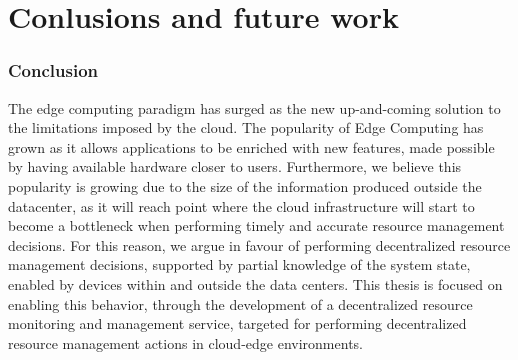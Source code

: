 

\chapter{Conlusions and future work} \label{cha:conclusions_future_work}

\subsection{Conclusion}

The edge computing paradigm has surged as the new up-and-coming solution to the limitations imposed by the cloud. The popularity of Edge Computing has grown as it allows applications to be enriched with new features, made possible by having available hardware closer to users. Furthermore, we believe this popularity is growing due to the size of the information produced outside the datacenter, as it will reach point where the cloud infrastructure will start to become a bottleneck when performing timely and accurate resource management decisions. For this reason, we argue in favour of performing decentralized resource management decisions, supported by partial knowledge of the system state, enabled by devices within and outside the data centers. This thesis is focused on enabling this behavior, through the development of a decentralized resource monitoring and management service, targeted for performing decentralized resource management actions in cloud-edge environments.

